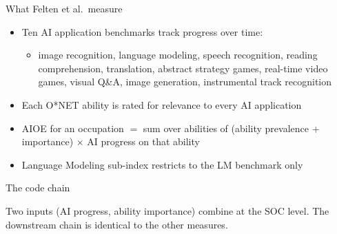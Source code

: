 
\begin{frame}{What Felten et al.\ measure}
\begin{itemize}\setlength{\itemsep}{6pt}
  \item Ten AI application benchmarks track progress over time:
  \begin{itemize}
    \item image recognition, language modeling, speech recognition, reading comprehension, translation, abstract strategy games, real-time video games, visual Q\&A, image generation, instrumental track recognition
  \end{itemize}
  \item Each O*NET ability is rated for relevance to every AI application
  \item AIOE for an occupation $=$ sum over abilities of (ability prevalence + importance) $\times$ AI progress on that ability
  \item Language Modeling sub-index restricts to the LM benchmark only
\end{itemize}
\end{frame}

\begin{frame}{The code chain}
\centering
{}

\vspace{1em}
Two inputs (AI progress, ability importance) combine at the SOC level. The downstream chain is identical to the other measures.
\end{frame}

